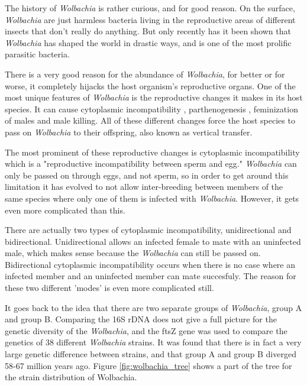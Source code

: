 \documentclass[twocolumn]{article}
\begin{document}
The history of \textit{Wolbachia} is rather curious, and for good reason. On the surface, \textit{Wolbachia} are just harmless bacteria living in the reproductive areas of different insects that don't really do anything. But only recently has it been shown that \textit{Wolbachia} has shaped the world in drastic ways, and is one of the most prolific parasitic bacteria.\cite{Wdistr}

There is a very good reason for the abundance of \textit{Wolbachia}, for better or for worse, it completely hijacks the host organism's reproductive organs. One of the most unique features of \textit{Wolbachia} is the reproductive changes it makes in its host species. It can cause cytoplasmic incompatibility \cite{Wci0}\cite{Wci1}\cite{Wci2}\cite{Wci3}, parthenogenesis \cite{Wparth}, feminization of males \cite{Wfem} and male killing.\cite{Wmale_killing} All of these different changes force the host species to pass on \textit{Wolbachia} to their offspring, also known as vertical transfer.

The most prominent of these reproductive changes is cytoplasmic incompatibility which is a "reproductive incompatibility between sperm and egg."\cite{Wbio} \textit{Wolbachia} can only be passed on through eggs, and not sperm, so in order to get around this limitation it has evolved to not allow inter-breeding between members of the same species where only one of them is infected with \textit{Wolbachia}. However, it gets even more complicated than this.

There are actually two types of cytoplasmic incompatibility, unidirectional and bidirectional. Unidirectional allows an infected female to mate with an uninfected male, which makes sense because the \textit{Wolbachia} can still be passed on. Bidirectional cytoplasmic incompatibility occurs when there is no case where an infected member and an uninfected member can mate succesfuly. The reason for these two different 'modes' is even more complicated still.

It goes back to the idea that there are two separate groups of \textit{Wolbachia}, group A and group B. Comparing the 16S rDNA does not give a full picture for the genetic diversity of the \textit{Wolbachia}, and the ftsZ gene was used to compare the genetics of 38 different \textit{Wolbachia} strains.\cite{Wgenetics} It was found that there is in fact a very large genetic difference between strains, and that group A and group B diverged 58-67 million years ago. Figure \ref{fig:wolbachia_tree} shows a part of the tree for the strain distribution of Wolbachia.
\end{document}

